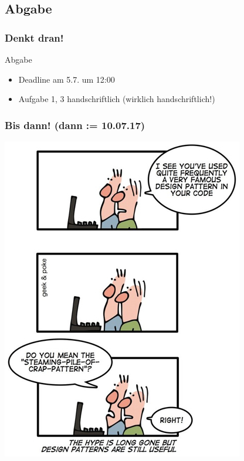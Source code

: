 \documentclass[18pt]{beamer}
\begin{document}
\subsection{Abgabe}
\begin{frame}
\frametitle{Denkt dran!}
\begin{alertblock}{Abgabe}
\begin{itemize}
\item Deadline am 5.7. um 12:00
\item Aufgabe 1, 3 handschriftlich (wirklich handschriftlich!)
\end{itemize}
\end{alertblock}
\end{frame}

\begin{frame}
\frametitle{Bis dann! (dann  := 10.07.17)}
\centering
\includegraphics[scale=0.4]{./comics/patterns.jpg}
\end{frame}
\end{document}
